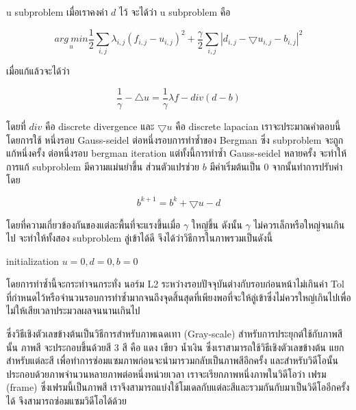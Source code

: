 \documentclass[hidelinks,a4paper,14pt]{article}
\numberwithin{equation}{section}							%
\begin{document}
{		u subproblem เมื่อเราคงค่า $d$ ไว้ จะได้ว่า u subproblem คือ
		
		$$ \underset{u}{arg \ min} \frac{1}{2} \sum_{i,j} \lambda_{i,j}  (f_{i,j} - u_{i,j})^2 + \frac{\gamma}{2} \sum_{i,j} |d_{i,j} - \bigtriangledown u_{i,j} - b_{i,j}|^2$$
		
		เมื่อแก้แล้วจะได้ว่า
		
		$$ \frac{1}{\gamma} - \bigtriangleup u = \frac{1}{\gamma} \lambda f - div (d-b)$$
		
		โดยที่ $div$ คือ discrete divergence และ $\bigtriangledown u$ คือ discrete lapacian เราจะประมาณคำตอบนี้โดยการใช้ หนึ่งรอบ Gauss-seidel ต่อหนึ่งรอบการทำซ้ำของ Bergman ซึ่ง subproblem จะถูกแก้หนึ่งครั้ง ต่อหนึ่งรอบ bergman iteration แต่ทั้งนี้การทำซ้ำ Gauss-seidel หลายครั้ง จะทำให้การแก้ subproblem มีความแม่นยำขึ้น
		ส่วนตัวแปรช่วย $b$ มีค่าเริ่มต้นเป็น 0 จากนั้นทำการปรับค่าโดย
		
		$$ b^{k+1} = b^k  + \bigtriangledown u - d $$
		
		โดยที่ความเกี่ยวข้องกันของแต่ละพื้นที่จะแรงขึ้นเมื่อ $\gamma$ ใหญ่ขึ้น ดังนั้น $\gamma$ ไม่ควรเล็กหรือใหญ่จนเกินไป จะทำให้ทั้งสอง subproblem ลู่เข้าได้ดี
		จึงได้ว่าวิธีการในภาพรวมเป็นดังนี้
		
		
		
		\begin{algorithm}[H]
			\begin{framed}
				initialization $u = 0, d = 0, b = 0$\\
			\end{framed}
		\end{algorithm}
		
		
		
		โดยการทำซ้ำนี้จะกระทำจนกระทั่ง นอร์ม L2 ระหว่างรอบปัจจุบันต่างกับรอบก่อนหน้าไม่เกินค่า Tol ที่กำหนดไว้หรือจำนวนรอบการทำซ้ำมากจนถึงจุดสิ้นสุดที่เพียงพอที่จะให้ลู่เข้าซึ่งไม่ควรใหญ่เกินไปเพื่อไม่ให้เสียเวลาประมวลผลจนนานเกินไป 
	
		
		
		ซึ่งวิธีเชิงตัวเลขข้างต้นเป็นวิธีการสำหรับภาพเฉดเทา (Gray-scale) สำหรับการประยุกต์ใช้กับภาพสีนั้น ภาพสี จะประกอบขึ้นด้วยสี  3 สี คือ แดง เขียว น้ำเงิน ซึ่งเราสามารถใช้วิธีเชิงตัวเลขข้างต้น แยกสำหรับแต่ละสี เพื่อทำการซ่อมแซมภาพก่อนจะนำมารวมกลับเป็นภาพสีอีกครั้ง และสำหรับวิดีโอนั้นประกอบด้วยภาพจำนวนหลายภาพต่อหนึ่งหน่วยเวลา เราจะเรียกภาพหนึ่งภาพในวิดีโอว่า เฟรม (frame) ซึ่งเฟรมนี้เป็นภาพสี เราจึงสามารถแบ่งใช้โมเดลกับแต่ละสีและรวมกันกับมาเป็นวิดีโออีกครั้งได้ จึงสามารถซ่อมแซมวิดีโอได้ด้วย
	
}
\end{document}
